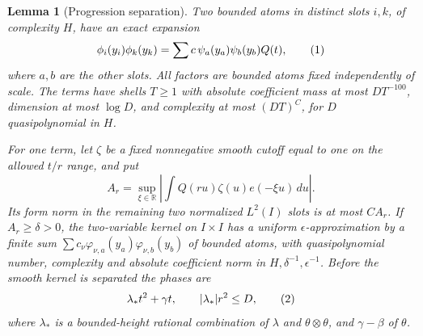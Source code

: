 \documentclass[11pt]{article}
\newtheorem{lemma}[theorem]{Lemma}
\theoremstyle{definition}
\newcommand{\R}{\mathbb R}
\newcommand{\eqtag}[1]{\refstepcounter{equation}\tag{\theequation}\label{#1}}
\numberwithin{equation}{section}
\begin{document}
\begin{lemma}[Progression separation]\label{lem:separation}
Two bounded atoms in distinct slots $i,k$, of complexity $H$, have an exact expansion
\[
 \phi_i(y_i)\phi_k(y_k)=\sum c\,\psi_a(y_a)\psi_b(y_b)Q(t),
 \eqtag{eq:separation}
\]
where $a,b$ are the other slots. All factors are bounded atoms fixed independently of scale. The terms have shells $T\ge1$ with absolute coefficient mass at most $DT^{-100}$, dimension at most $\log D$, and complexity at most $(DT)^C$, for $D$ quasipolynomial in $H$.

For one term, let $\zeta$ be a fixed nonnegative smooth cutoff equal to one on the allowed $t/r$ range, and put
\[
 A_r=\sup_{\xi\in\R}\left|\int Q(ru)\zeta(u)e(-\xi u)\,du\right|.
\]
Its form norm in the remaining two normalized $L^2(I)$ slots is at most $CA_r$. If $A_r\ge\delta>0$, the two-variable kernel on $I\times I$ has a uniform $\epsilon$-approximation by a finite sum $\sum c_\nu\varphi_{\nu,a}(y_a)\varphi_{\nu,b}(y_b)$ of bounded atoms, with quasipolynomial number, complexity and absolute coefficient norm in $H,\delta^{-1},\epsilon^{-1}$. Before the smooth kernel is separated the phases are
\[
 \lambda_*t^2+\gamma t,\qquad |\lambda_*|r^2\le D,
 \eqtag{eq:separated-phase}
\]
where $\lambda_*$ is a bounded-height rational combination of $\lambda$ and $\theta\otimes\theta$, and $\gamma-\beta$ of $\theta$.
\end{lemma}
\end{document}
